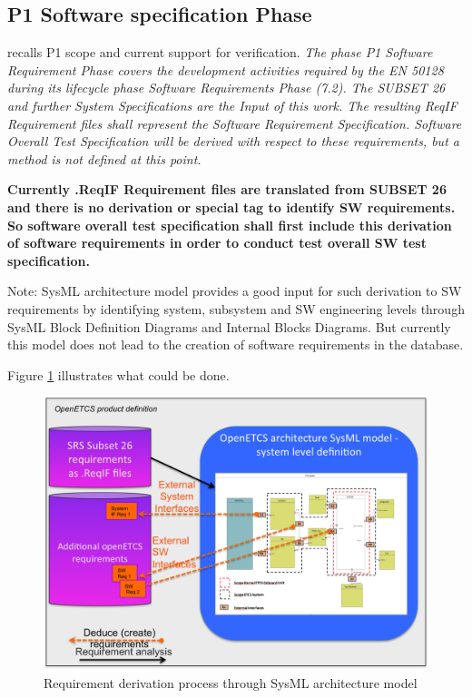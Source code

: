 \documentclass[11pt]{template/openetcs_report}
\begin{document}
\subsection{P1 Software specification Phase}

\cite{D4.2.3} recalls P1 scope and current support for verification.
\textit{The phase P1 Software Requirement Phase covers the development activities required by the EN 50128 during its lifecycle phase Software Requirements Phase (7.2). The SUBSET 26 and further System Specifications are the Input of this work. The resulting ReqIF Requirement files shall represent the Software Requirement Specification. Software Overall Test Specification will be derived with respect to these requirements, but a method is not defined at this point.}

\textbf{Currently .ReqIF Requirement files are translated from SUBSET 26 and there is no derivation or special tag to identify SW requirements. So software overall test specification shall first include this derivation of software requirements in order to conduct test overall SW test specification.}

Note: SysML architecture model provides a good input for such derivation to SW requirements by identifying system, subsystem and SW engineering levels through SysML Block Definition Diagrams and Internal Blocks Diagrams. But currently this model does not lead to the creation of software requirements in the database. 

Figure \ref{fig:P1RequirementDerivationWithSysMLModel} illustrates what could be done.

\begin{figure}[htbp]
\centering
\includegraphics[width=1.0\linewidth]
{./images/P1RequirementDerivationWithSysMLModel.png}
\caption{\label{fig:P1RequirementDerivationWithSysMLModel}Requirement derivation process through SysML architecture model}
\end{figure}
\end{document}
